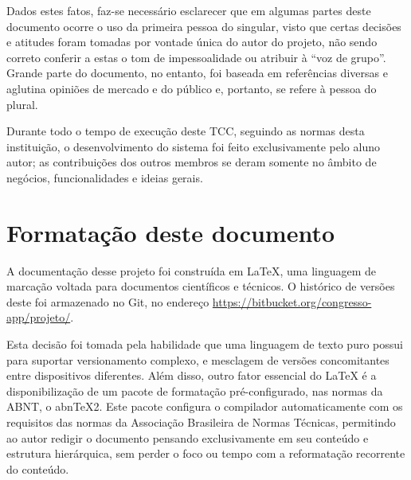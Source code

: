 \documentclass[12pt,a4paper,twoside,hyphens,english,brazil]{abntex2}
\begin{document}
\begin{KeepFromToc}
Dados estes fatos, faz-se necessário esclarecer que em algumas partes deste documento ocorre o uso da primeira pessoa do singular, visto que certas decisões e atitudes foram tomadas por vontade única do autor do projeto, não sendo correto conferir a estas o tom de impessoalidade ou atribuir à ``voz de grupo''. Grande parte do documento, no entanto, foi baseada em referências diversas e aglutina opiniões de mercado e do público e, portanto, se refere à pessoa do plural.


Durante todo o tempo de execução deste TCC, seguindo as normas desta instituição, o desenvolvimento do sistema foi feito exclusivamente pelo aluno autor; as contribuições dos outros membros se deram somente no âmbito de negócios, funcionalidades e ideias gerais.

\section*{Formatação deste documento}
A documentação desse projeto foi construída em \LaTeX, uma linguagem de marcação voltada para documentos científicos e técnicos. O histórico de versões deste foi armazenado no Git, no endereço \url{https://bitbucket.org/congresso-app/projeto/}.

Esta decisão foi tomada pela habilidade que uma linguagem de texto puro possui para suportar versionamento complexo, e mesclagem de versões concomitantes entre dispositivos diferentes. Além disso, outro fator essencial do \LaTeX{} é a disponibilização de um pacote de formatação pré-configurado, nas normas da ABNT, o abn\TeX{}2\cite{abntex2}\cite{abntex2-slides}. Este pacote configura o compilador automaticamente com os requisitos das normas da Associação Brasileira de Normas Técnicas, permitindo ao autor redigir o documento pensando exclusivamente em seu conteúdo e estrutura hierárquica, sem perder o foco ou tempo com a reformatação recorrente do conteúdo.
\end{KeepFromToc}

\textual
\end{document}
